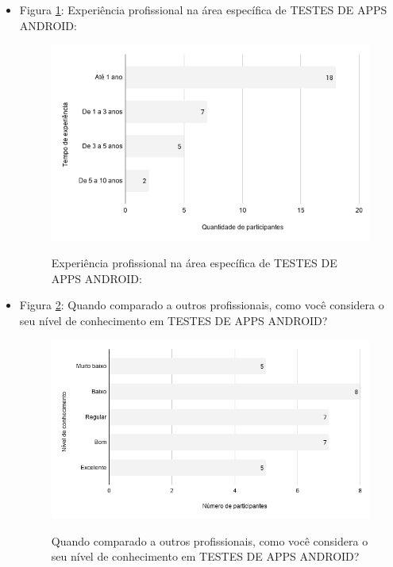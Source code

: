 \begin{itemize}
    \item Figura \ref{figure:s_experienciatestesandroid}: Experiência profissional na área específica de TESTES DE APPS ANDROID:
    \begin{figure}[!htb]
    \centering
    \includegraphics[width=.80\textwidth]{images/s_experienciatestesandroid.png}
    \label{figure:s_experienciatestesandroid}
    \caption{Experiência profissional na área específica de TESTES DE APPS ANDROID:}
    \end{figure}
    
    
     \item Figura \ref{figure:s_conhecimentotestesandroid}: Quando comparado a outros profissionais, como você considera o seu nível de conhecimento em TESTES DE APPS ANDROID?
    \begin{figure}[!htb]
    \centering
    \includegraphics[width=.80\textwidth]{images/s_conhecimentotestesandroid.png}
    \label{figure:s_conhecimentotestesandroid}
    \caption{Quando comparado a outros profissionais, como você considera o seu nível de conhecimento em TESTES DE APPS ANDROID?}
    \end{figure}   
    
    
    

\end{itemize}
